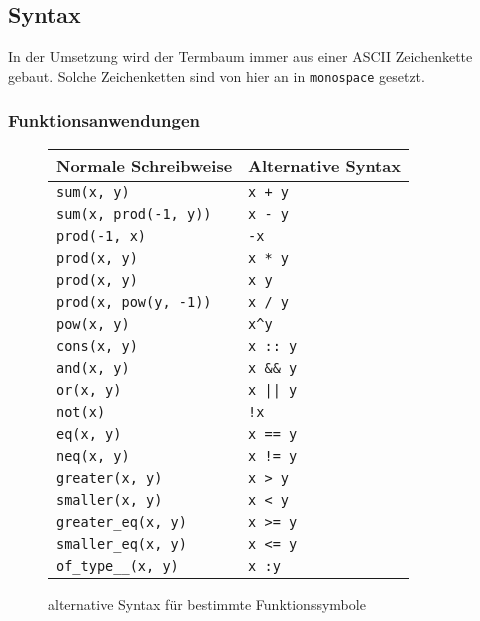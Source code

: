 \subsection{Syntax} \label{subsecSyntax}
In der Umsetzung wird der Termbaum immer aus einer ASCII Zeichenkette gebaut.
Solche Zeichenketten sind von hier an in \texttt{monospace} gesetzt.

\subsubsection{Funktionsanwendungen}
\begin{figure}
    \label{tabZucker}
    \centering
    \begin{tabular}{l l}
        \hline
        Normale Schreibweise & Alternative Syntax\\
        \hline \hline
        \verb|sum(x, y)|           & \verb|x + y|\\
        \verb|sum(x, prod(-1, y))| & \verb|x - y|\\
        \verb|prod(-1, x)|         & \verb|-x|\\
        \verb|prod(x, y)|          & \verb|x * y|\\
        \verb|prod(x, y)|          & \verb|x y|\\
        \verb|prod(x, pow(y, -1))| & \verb|x / y|\\
        \verb|pow(x, y)|           & \verb|x^y|\\
        \verb|cons(x, y)|           & \verb|x :: y|\\
        \verb|and(x, y)|           & \verb|x && y|\\
        \verb|or(x, y)|            & \verb!x || y!\\
        \verb|not(x)|              & \verb|!x|\\
        \verb|eq(x, y)|            & \verb|x == y|\\
        \verb|neq(x, y)|           & \verb|x != y|\\
        \verb|greater(x, y)|       & \verb|x > y|\\
        \verb|smaller(x, y)|       & \verb|x < y|\\
        \verb|greater_eq(x, y)|    & \verb|x >= y|\\
        \verb|smaller_eq(x, y)|    & \verb|x <= y|\\
        \verb|of_type__(x, y)|     & \verb|x :y|\\
        \hline
    \end{tabular}
    \caption{alternative Syntax für bestimmte Funktionssymbole}
\end{figure}

